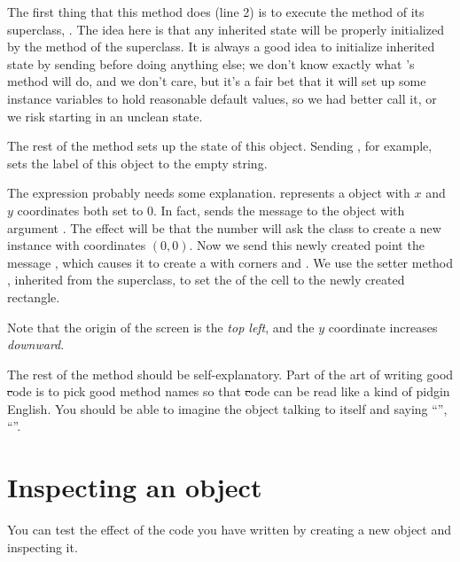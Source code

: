 \documentclass[a4paper,10pt,twoside]{book}
\begin{document}
The first thing that this method does (line 2) is to execute the  method of its superclass, .
The idea here is that any inherited state will be properly initialized by the  method of the superclass.
It is always a good idea to initialize inherited state by sending  before doing anything else; we don't know exactly what 's  method will do, and we don't care, but it's a fair bet that it will set up some instance variables to hold reasonable default values, so we had better call it, or we risk starting in an unclean state.

The rest of the method sets up the state of this object.
Sending , for example, sets the label of this object to the empty string.

The expression  probably needs some explanation.
 represents a  object with $x$ and $y$ coordinates both set to 0.
In fact,  sends the message  to the  object  with argument .
The effect will be that the number  will ask the  class to create a new instance with coordinates $(0,0)$.
Now we send this newly created point the message , which causes it to create a  with corners  and .
We use the setter method , inherited from the superclass, to set the  of the cell to the newly created rectangle.

Note that the origin of the \sq screen is the \emph{top left}, and the $y$ coordinate increases \emph{downward}.

The rest of the method should be self-explanatory.
Part of the art of writing good \st code is to pick good method names so that \st code can be read like a kind of pidgin English.
You should be able to imagine the object talking to itself and saying ``'', ``''.

\section{Inspecting an object}

You can test the effect of the code you have written by creating a new  object and inspecting it.

\end{document}
